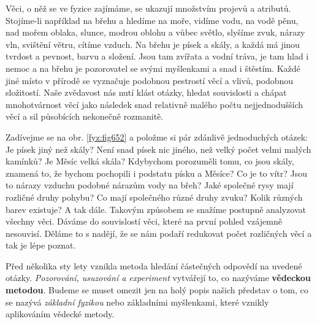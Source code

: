     Věci, o něž se ve fyzice zajímáme, se ukazují množstvím projevů a atributů. Stojíme-li 
    například na břehu a hledíme na moře, vidíme vodu, na vodě pěnu, nad mořem oblaka, slunce, 
    modrou oblohu a vůbec světlo, slyšíme zvuk, nárazy vln, svištění větru, cítíme vzduch. Na břehu 
    je písek a skály, a každá má jinou tvrdost a pevnost, barvu a složení. Jsou tam zvířata a vodní 
    tráva, je tam hlad i nemoc a na břehu je pozorovatel se svými myšlenkami a snad i štěstím. 
    Každé jiné místo v přírodě se vyznačuje podobnou pestrostí věcí a vlivů, podobnou složitostí. 
    Naše zvědavost nás nutí klást otázky, hledat souvislosti a chápat mnohotvárnost věcí jako 
    následek snad relativně malého počtu nejjednodušších věcí a sil působících nekonečně rozmanitě.
    
    Zadívejme se na obr. \ref{fyz:fig652} a položme si pár zdánlivě jednoduchých otázek: Je písek
    jiný než skály? Není snad písek nic jiného, než velký počet velmi malých kamínků? Je Měsíc velká
    skála? Kdybychom porozuměli tomu, co jsou skály, znamená to, že bychom pochopili i podstatu
    písku a Měsíce? Co je to vítr? Jsou to nárazy vzduchu podobné nárazům vody na břeh? Jaké
    společné rysy mají rozličné druhy pohybu? Co mají společného různé druhy zvuku? Kolik různých
    barev existuje? A tak dále. Takovým způsobem se snažíme postupně analyzovat všechny věci. Dáváme
    do souvislostí věci, které na první pohled vzájemně nesouvisí. Děláme to s nadějí, že se nám
    podaří redukovat počet rozličných věcí a tak je lépe poznat.

    
    Před několika sty lety vznikla metoda hledání částečných odpovědí na uvedené otázky. 
    \emph{Pozorování, usuzování a experiment} vytvářejí to, co nazýváme \textbf{vědeckou metodou}. 
    Budeme se muset omezit jen na holý popis našich představ o tom, co se nazývá \emph{základní 
    fyzikou} nebo základními myšlenkami, které vznikly aplikováním vědecké metody.
    
